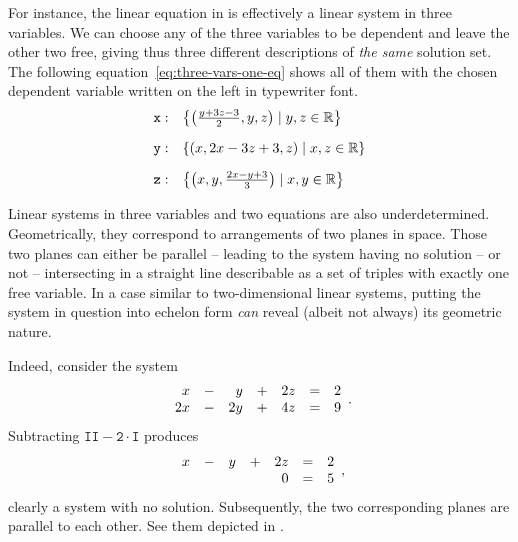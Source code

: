 For instance, the linear equation in  is effectively a
linear system in three variables. We can choose any of the three variables to be
dependent and leave the other two free, giving thus three different descriptions
of \emph{the same} solution set. The following
equation~\eqref{eq:three-vars-one-eq} shows all of them with the chosen
dependent variable written on the left in typewriter font.
\begin{equation}
 \label{eq:three-vars-one-eq}
 \begin{array}{r l}
  \mathtt{x:} & \left\{ \left( \frac{y + 3z - 3}{2}, y, z \right) \mid y,z \in \mathbb{R}
  \right\}\\[1em]
  \mathtt{y:} & \left\{ \left( x, 2x - 3z + 3, z \right) \mid x,z \in \mathbb{R}
  \right\}\\[1em]
   \mathtt{z:} & \left\{ \left( x, y, \frac{2x - y + 3}{3} \right) \mid x,y \in
   \mathbb{R} \right\}
 \end{array}
\end{equation}

Linear systems in three variables and two equations are also underdetermined.
Geometrically, they correspond to arrangements of two planes in space. Those two
planes can either be parallel -- leading to the system having no solution -- or
not -- intersecting in a straight line describable as a set of triples with
exactly one free variable. In a case similar to two-dimensional linear systems,
putting the system in question into echelon form \emph{can} reveal (albeit not
always) its geometric nature.

Indeed, consider the system
\begin{equation}
 \label{eq:two-parallel-planes}
 \begin{array}{r c r c r c r}
  x & - & y & + & 2z & = & 2\\
  2x & - & 2y & + & 4z & = & 9
 \end{array}.
\end{equation}
Subtracting $\mathtt{II - 2 \cdot I}$ produces
\[
 \begin{array}{r c r c r c r}
  x & - & y & + & 2z & = & 2\\
    &   &   &   &  0 & = & 5
 \end{array},
\]
clearly a system with no solution. Subsequently, the two corresponding planes
are parallel to each other. See them depicted in
.

